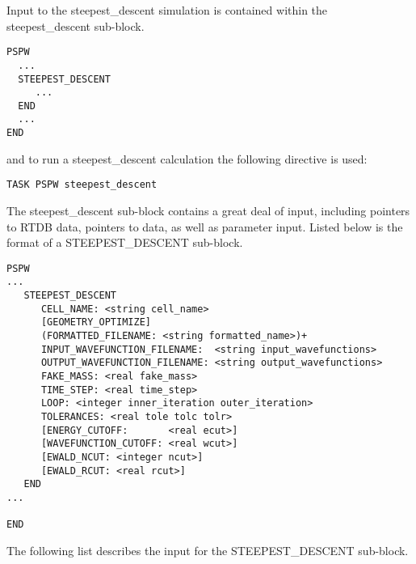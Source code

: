 Input to the steepest\_descent simulation is contained
within the steepest\_descent sub-block.
\begin{verbatim}
PSPW
  ...
  STEEPEST_DESCENT
     ...
  END
  ...
END
\end{verbatim}
and to run a steepest\_descent calculation the following directive is used:
\begin{verbatim}
TASK PSPW steepest_descent 
\end{verbatim}
The steepest\_descent sub-block contains a great deal
of input, including pointers to RTDB data, pointers to data, as well as
parameter input.  Listed below is the format of a STEEPEST\_DESCENT sub-block.
\begin{verbatim}
PSPW
...
   STEEPEST_DESCENT
      CELL_NAME: <string cell_name>
      [GEOMETRY_OPTIMIZE]
      (FORMATTED_FILENAME: <string formatted_name>)+
      INPUT_WAVEFUNCTION_FILENAME:  <string input_wavefunctions>
      OUTPUT_WAVEFUNCTION_FILENAME: <string output_wavefunctions>
      FAKE_MASS: <real fake_mass>
      TIME_STEP: <real time_step>
      LOOP: <integer inner_iteration outer_iteration>
      TOLERANCES: <real tole tolc tolr>
      [ENERGY_CUTOFF:       <real ecut>]
      [WAVEFUNCTION_CUTOFF: <real wcut>]
      [EWALD_NCUT: <integer ncut>]
      [EWALD_RCUT: <real rcut>]
   END
...

END
\end{verbatim}
The following list describes the input for the STEEPEST\_DESCENT
sub-block.
